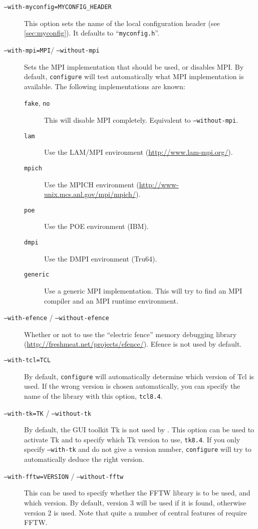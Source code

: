 \begin{description}
\item[\texttt{--with-myconfig=MYCONFIG\_HEADER}] This option sets the
  name of the local configuration header (see \vref{sec:myconfig}). It
  defaults to ``\texttt{myconfig.h}''.
\item[\texttt{--with-mpi=MPI}/ \texttt{--without-mpi}] Sets the MPI
  implementation that should be used, or disables MPI. By default,
  \texttt{configure} will test automatically what MPI implementation
  is available. The following implementations are known:
  \begin{description}
  \item[\texttt{fake}, \texttt{no}] This will disable MPI
    completely. Equivalent to \mbox{\texttt{--without-mpi}}.
  \item[\texttt{lam}] Use the LAM/MPI environment
    (\url{http://www.lam-mpi.org/}).
  \item[\texttt{mpich}] Use the MPICH environment
    (\url{http://www-unix.mcs.anl.gov/mpi/mpich/}).
  \item[\texttt{poe}] Use the POE environment (IBM).
  \item[\texttt{dmpi}] Use the DMPI environment (Tru64).
  \item[\texttt{generic}] Use a generic MPI implementation. This will
    try to find an MPI compiler and an MPI runtime environment.
  \end{description}
\item[\texttt{--with-efence} / \texttt{--without-efence}] Whether or
  not to use the ``electric fence'' memory debugging library
  (\url{http://freshmeat.net/projects/efence/}). Efence is not used by
  default.
\item[\texttt{--with-tcl=TCL}] By default, \texttt{configure} will
  automatically determine which version of Tcl is used.  If the wrong
  version is chosen automatically, you can specify the name of the
  library with this option, \eg{} \texttt{tcl8.4}.
\item[\texttt{--with-tk=TK} / \texttt{--without-tk}] By default, the
  GUI toolkit Tk is not used by \es. This option can be used to
  activate Tk and to specify which Tk version to use, \eg{}
  \texttt{tk8.4}. If you only specify \texttt{--with-tk} and do not
  give a version number, \texttt{configure} will try to automatically
  deduce the right version.
\item[\texttt{--with-fftw=VERSION} / \texttt{--without-fftw}] This can
  be used to specify whether the FFTW library is to be used, and which
  version.  By default, version 3 will be used if it is found,
  otherwise version 2 is used.  Note that quite a number of central
  features of \es require FFTW.
\end{description}

